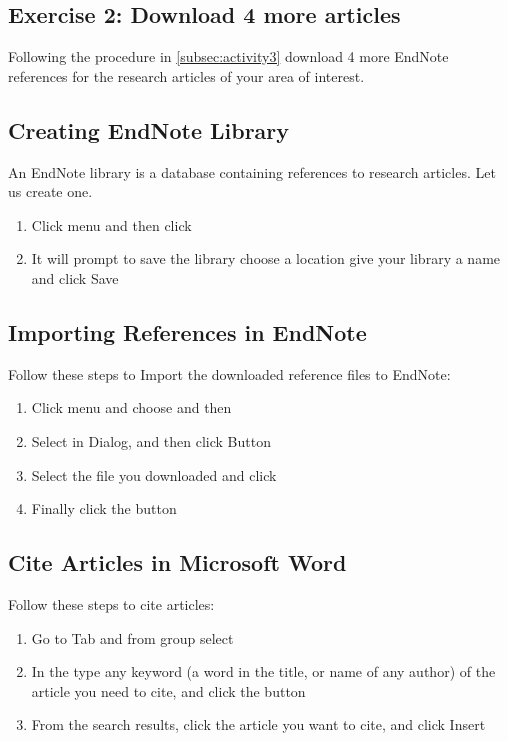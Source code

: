  \subsection{Exercise 2: Download 4 more articles }
 Following the procedure in \ref{subsec:activity3} download 4 more EndNote references for the research articles of your area of interest.
 \subsection{Creating EndNote Library}
 An EndNote library is a database containing references to research articles. Let us create one.
 \begin{enumerate}
 \item Click  menu and then click 
 \item It will prompt to save the library choose a location give your library a name and click Save
 \end{enumerate}
 \subsection{Importing References in EndNote}
 Follow these steps to Import the downloaded reference files to EndNote:
 \begin{enumerate}
 \item Click  menu and choose  and then 
 \item Select  in  Dialog, and then click  Button
 \item Select the file you downloaded and click 
 \item Finally click the  button
 \end{enumerate}
 \subsection{Cite Articles in Microsoft Word}
 Follow these steps to cite articles:
 \begin{enumerate}
 \item Go to  Tab and from  group select 
 \item In the  type any keyword (a word in the title, or name of any author) of the article you need to cite, and click the  button
 \item From the search results, click the article you want to cite, and click Insert
 \end{enumerate}
